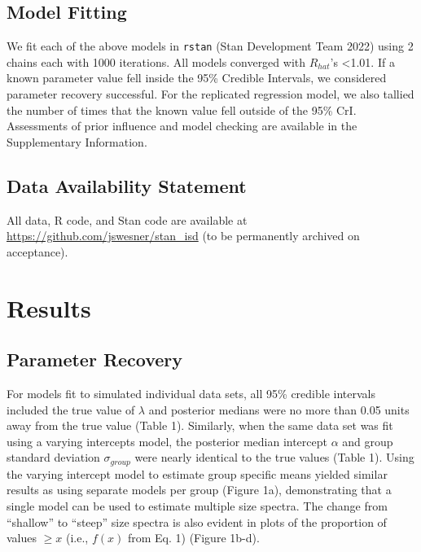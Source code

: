 \documentclass[
  12pt,
]{article}
\begin{document}
\hypertarget{model-fitting}{%
\subsection{Model Fitting}\label{model-fitting}}

We fit each of the above models in \texttt{rstan} (Stan Development Team
2022) using 2 chains each with 1000 iterations. All models converged
with \(R_{hat}\)'s \textless1.01. If a known parameter value fell inside
the 95\% Credible Intervals, we considered parameter recovery
successful. For the replicated regression model, we also tallied the
number of times that the known value fell outside of the 95\% CrI.
Assessments of prior influence and model checking are available in the
Supplementary Information.

\hypertarget{data-availability-statement}{%
\subsection{Data Availability
Statement}\label{data-availability-statement}}

All data, R code, and Stan code are available at
\url{https://github.com/jswesner/stan_isd} (to be permanently archived
on acceptance).

\hypertarget{results}{%
\section{Results}\label{results}}

\hypertarget{parameter-recovery}{%
\subsection{Parameter Recovery}\label{parameter-recovery}}

For models fit to simulated individual data sets, all 95\% credible
intervals included the true value of \(\lambda\) and posterior medians
were no more than 0.05 units away from the true value (Table 1).
Similarly, when the same data set was fit using a varying intercepts
model, the posterior median intercept \(\alpha\) and group standard
deviation \(\sigma_{group}\) were nearly identical to the true values
(Table 1). Using the varying intercept model to estimate group specific
means yielded similar results as using separate models per group (Figure
1a), demonstrating that a single model can be used to estimate multiple
size spectra. The change from ``shallow'' to ``steep'' size spectra is
also evident in plots of the proportion of values \(\ge x\) (i.e.,
\(f(x)\) from Eq. 1) (Figure 1b-d).
\end{document}

